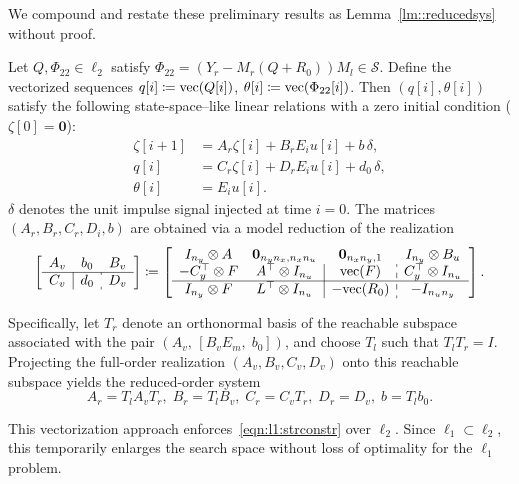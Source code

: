 We compound and restate these preliminary results as Lemma~\ref{lm::reducedsys} without proof. 





\begin{lemma}\label{lm::reducedsys}
Let $Q,\Phi_{22}\in\ell_2$ satisfy \(\Phi_{22} = (Y_r - M_r (Q + R_0)) M_l \in \mathcal{S}\).
Define the vectorized sequences \(q[i] \coloneqq {\mathrm{vec}}(Q[i])\), \(\theta[i] \coloneqq {\mathrm{vec}}(\Phi_{22}[i])\).
Then $(q[i],\theta[i])$ satisfy the following state-space–like linear relations with a zero initial condition (\(\zeta[0] = \mathbf{0}\)):
\begin{subequations}\label{eqn::ss::reducedvec}
\begin{align}
\zeta[i+1] &= A_r \zeta[i] + B_r E_i u[i] + b\,\delta, \\
q[i] &= C_r \zeta[i] + D_r E_i u[i] + d_0\,\delta, \\
\theta[i] & = E_i u[i].
\end{align}
\end{subequations}
\(\delta\) denotes the unit impulse signal injected at time \(i = 0\).
The matrices $(A_r,B_r,C_r,D_i,b)$ are obtained via a model reduction of the realization
\begin{equation}
\left[\begin{array}{c|c:c}
    A_v & b_0 & B_v \\
    \hline
    C_v & d_0 & D_v
\end{array}\right]  
\coloneqq 
\left[
\begin{array}{cc|c:c}
I_{n_y}\otimes A &  \mathbf{0}_{n_y n_x,n_x n_u} & \mathbf{0}_{n_x n_y,1} & I_{n_y} \otimes B_u\\
-C_y^\top \otimes F & A^\top\otimes I_{n_u} & \vc(F) & C_y^\top \otimes I_{n_u} \\
\hline
I_{n_y} \otimes F & L^\top \otimes I_{n_u} & -\vc(R_0) & -I_{n_u n_y} 
\end{array}\right]. 
\end{equation}


Specifically, let $T_r$ denote an orthonormal basis of the reachable subspace associated with the pair
\((A_v,\,[B_v E_m,\; b_0])\), and choose $T_l$ such that $T_l T_r = I$. Projecting the full-order realization
$(A_v,B_v,C_v,D_v)$ onto this reachable subspace yields the reduced-order system
\[
A_r = T_l A_v T_r, \;
B_r = T_l B_v, \;
C_r = C_v T_r, \;
D_r = D_v, \;
b = T_l b_0.
\]
\end{lemma}
\begin{rem}
This vectorization approach enforces~\eqref{eqn:l1:strconstr} over $\ell_2$. Since $\ell_1 \subset \ell_2$, this temporarily enlarges the search space without loss of optimality for the $\ell_1$ problem.
\end{rem}

